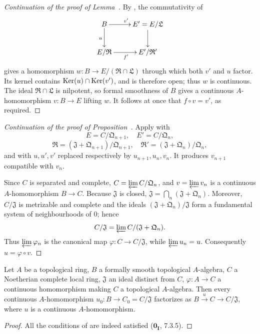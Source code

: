 \begin{proof}[Continuation of the proof of Lemma~{\rm{}}]
By , the commutativity of
\[
\xymatrix{
  B \ar[r]^{v'} \ar[d]_u & E'=E/\mathfrak{L} \ar[d] \\
  E/\mathfrak{R} \ar[r]_{f'} & E'/\mathfrak{R}'
}
\]
gives a homomorphism $w:B\to E/(\mathfrak{R}\cap\mathfrak{L})$ through which both $v'$ and $u$ factor.
Its kernel contains $\operatorname{Ker}(u)\cap\operatorname{Ker}(v')$, and is therefore open; thus $w$ is continuous.
The ideal $\mathfrak{R}\cap\mathfrak{L}$ is nilpotent, so formal smoothness of $B$ gives a continuous $A$-homomorphism $v:B\to E$ lifting $w$.
It follows at once that $f\circ v=v'$, as required.
\end{proof}

\begin{proof}[Continuation of the proof of Proposition~{\rm{}}]
Apply  with
\[
  E=C/\mathfrak{Q}_{n+1},\quad E'=C/\mathfrak{Q}_n,
\]
\[
  \mathfrak{R}=(\mathfrak{J}+\mathfrak{Q}_{n+1})/\mathfrak{Q}_{n+1},\quad
  \mathfrak{R}'=(\mathfrak{J}+\mathfrak{Q}_n)/\mathfrak{Q}_n,
\]
and with $u,u',v'$ replaced respectively by $u_{n+1},u_n,v_n$.
It produces $v_{n+1}$ compatible with $v_n$.

Since $C$ is separated and complete, $C=\varprojlim C/\mathfrak{Q}_n$, and $v=\varprojlim v_n$ is a continuous $A$-homomorphism $B\to C$.
Because $\mathfrak{J}$ is closed, $\mathfrak{J}=\bigcap_n(\mathfrak{J}+\mathfrak{Q}_n)$.
Moreover, $C/\mathfrak{J}$ is metrizable and complete and the ideals $(\mathfrak{J}+\mathfrak{Q}_n)/\mathfrak{J}$ form a fundamental system of neighbourhoods of $0$; hence
\[
  C/\mathfrak{J}=\varprojlim C/(\mathfrak{J}+\mathfrak{Q}_n).
\]
Thus $\varprojlim\varphi_n$ is the canonical map $\varphi:C\to C/\mathfrak{J}$, while $\varprojlim u_n=u$.
Consequently $u=\varphi\circ v$.
\end{proof}

\begin{corollary}[19.3.11]
\label{0.19.3.11}
Let $A$ be a topological ring, $B$ a formally smooth topological $A$-algebra, $C$ a Noetherian complete local ring, $\mathfrak{J}$ an ideal distinct from $C$, $\varphi:A\to C$ a continuous homomorphism making $C$ a topological $A$-algebra.
Then every continuous $A$-homomorphism $u_0:B\to C_0=C/\mathfrak{J}$ factorizes as $B\xrightarrow{u}C\to C/\mathfrak{J}$, where $u$ is a continuous $A$-homomorphism.
\end{corollary}

\begin{proof}
All the conditions of  are indeed satisfied ($\mathbf{0_I}$, 7.3.5).
\end{proof}

